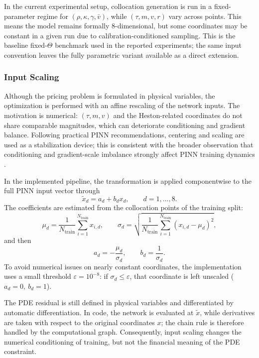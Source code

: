 In the current experimental setup, collocation generation is run in a fixed-parameter regime for \((\rho,\kappa,\gamma,\bar v)\), while \((\tau,m,v,r)\) vary across points. This means the model remains formally 8-dimensional, but some coordinates may be constant in a given run due to calibration-conditioned sampling.
This is the baseline fixed-\(\Theta\) benchmark used in the reported experiments; the same input convention leaves the fully parametric variant available as a direct extension.

\subsubsection*{Input Scaling}

Although the pricing problem is formulated in physical variables, the optimization is performed with an affine rescaling of the network inputs. The motivation is numerical: \((\tau,m,v)\) and the Heston-related coordinates do not share comparable magnitudes, which can deteriorate conditioning and gradient balance. Following practical PINN recommendations, centering and scaling are used as a stabilization device; this is consistent with the broader observation that conditioning and gradient-scale imbalance strongly affect PINN training dynamics \cite{wang2021gradientpath,wang2022pinnntk,urban_2025}.

In the implemented pipeline, the transformation is applied componentwise to the full PINN input vector through
\[
\tilde x_d = a_d + b_d x_d,\qquad d=1,\dots,8.
\]
The coefficients are estimated from the collocation points of the training split:
\[
\mu_d=\frac{1}{N_{\text{train}}}\sum_{i=1}^{N_{\text{train}}}x_{i,d},
\qquad
\sigma_d=\sqrt{\frac{1}{N_{\text{train}}}\sum_{i=1}^{N_{\text{train}}}(x_{i,d}-\mu_d)^2},
\]
and then
\[
a_d=-\frac{\mu_d}{\sigma_d},\qquad b_d=\frac{1}{\sigma_d}.
\]
To avoid numerical issues on nearly constant coordinates, the implementation uses a small threshold $\varepsilon=10^{-8}$: if $\sigma_d\le\varepsilon$, that coordinate is left unscaled ($a_d=0,\ b_d=1$).

The PDE residual is still defined in physical variables and differentiated by automatic differentiation. In code, the network is evaluated at \(\tilde x\), while derivatives are taken with respect to the original coordinates \(x\); the chain rule is therefore handled by the computational graph. Consequently, input scaling changes the numerical conditioning of training, but not the financial meaning of the PDE constraint.


